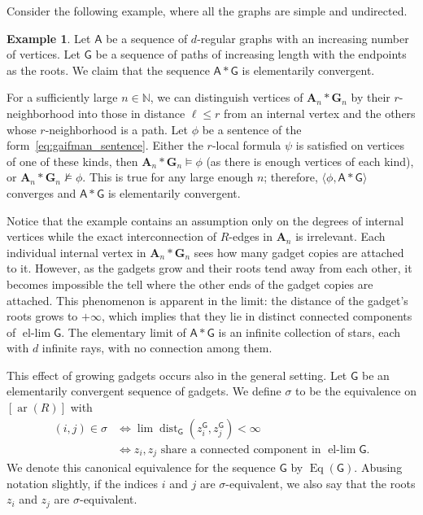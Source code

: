 \documentclass[11pt]{article}
\theoremstyle{plain}
\theoremstyle{definition}
\newtheorem{example}{Example}
\theoremstyle{remark}
\DeclareMathOperator\dist{dist}
\DeclareMathOperator\Eq{Eq}
\DeclareMathOperator\aritysym{ar}
\newcommand{\arity}[1]{{\aritysym({#1})}}
\newcommand{\N}{\mathbb{N}}
\newcommand{\stonepar}[2]{\langle #1, #2 \rangle}
\newcommand{\str}[1]{\mathbf{#1}}
\newcommand{\strseq}[1]{{\boldsymbol{\mathsf{#1}}}}
\DeclareMathOperator{\ellim}{el-lim}
\begin{document}
Consider the following example, where all the graphs are simple and undirected.

\begin{example}
    Let $\strseq{A}$ be a sequence of $d$-regular graphs with an increasing number of vertices.
    Let $\strseq{G}$ be a sequence of paths of increasing length with the endpoints as the roots.
    We claim that the sequence $\strseq{A}*\strseq{G}$ is elementarily convergent.

    For a sufficiently large $n \in \N$, we can distinguish vertices of $\str{A}_n * \str{G}_n$ by their $r$-neighborhood into those in distance $\ell \leq r$ from an internal vertex and the others whose $r$-neighborhood is a path.
    Let $\phi$ be a sentence of the form~\eqref{eq:gaifman_sentence}.
    Either the $r$-local formula $\psi$ is satisfied on vertices of one of these kinds, then $\str{A}_n * \str{G}_n \models \phi$ (as there is enough vertices of each kind), or $\str{A}_n * \str{G}_n \not\models \phi$.
    This is true for any large enough $n$; therefore, $\stonepar{\phi}{\strseq{A}*\strseq{G}}$ converges and $\strseq{A}*\strseq{G}$ is elementarily convergent.
\end{example}

Notice that the example contains an assumption only on the degrees of internal vertices while the exact interconnection of $R$-edges in $\str{A}_n$ is irrelevant.
Each individual internal vertex in $\str{A}_n*\str{G}_n$ sees how many gadget copies are attached to it.
However, as the gadgets grow and their roots tend away from each other, it becomes impossible the tell where the other ends of the gadget copies are attached.
This phenomenon is apparent in the limit: the distance of the gadget's roots grows to $+\infty$, which implies that they lie in distinct connected components of $\ellim \strseq{G}$.
The elementary limit of $\strseq{A}*\strseq{G}$ is an infinite collection of stars, each with $d$ infinite rays, with no connection among them.

This effect of growing gadgets occurs also in the general setting.
Let $\strseq{G}$ be an elementarily convergent sequence of gadgets.
We define $\sigma$ to be the equivalence on $[\arity{R}]$ with
\begin{equation}\label{eq:canonical_sigma}
\begin{aligned}
    (i,j) \in \sigma 
    &\Leftrightarrow 
    \lim \dist_\strseq{G}(z_i^\strseq{G}, z_j^\strseq{G}) < \infty \\
    &\Leftrightarrow
    z_i, z_j \text{ share a connected component in } \ellim \strseq{G}
    .
\end{aligned}
\end{equation}
We denote this canonical equivalence for the sequence $\strseq{G}$ by $\Eq(\strseq{G})$.
Abusing notation slightly, if the indices $i$ and $j$ are $\sigma$-equivalent, we also say that the roots $z_i$ and $z_j$ are $\sigma$-equivalent.
\end{document}
